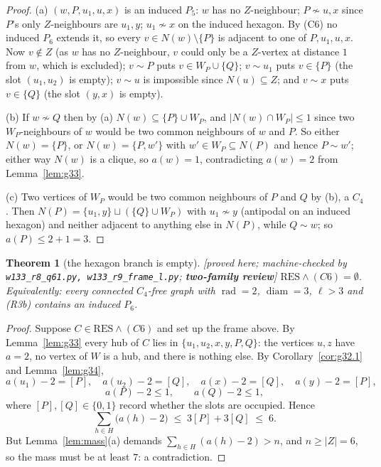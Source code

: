 \documentclass[11pt]{article}
\theoremstyle{plain}
\newtheorem{theorem}{Theorem}[section]
\theoremstyle{definition}
\theoremstyle{remark}
\numberwithin{equation}{section}
\newcommand{\rad}{\operatorname{rad}}
\newcommand{\diam}{\operatorname{diam}}
\newcommand{\statusbox}[1]{{\small\sloppy\textsf{[#1]}}}
\newcommand{\REV}[1]{\statusbox{proved here; machine-checked by \texttt{#1};
\textbf{two-family review}}}
\begin{document}
\begin{proof}
(a) $(w,P,u_1,u,x)$ is an induced $P_5$: $w$ has no $Z$-neighbour; $P \not\sim u,x$ since
$P$'s only $Z$-neighbours are $u_1,y$; $u_1\not\sim x$ on the induced hexagon. By (C6) no
induced $P_6$ extends it, so every $v \in N(w)\setminus\{P\}$ is adjacent to one of
$P,u_1,u,x$. Now $v \notin Z$ (as $w$ has no $Z$-neighbour, $v$ could only be a $Z$-vertex at
distance $1$ from $w$, which is excluded); $v \sim P$ puts $v \in W_P\cup\{Q\}$;
$v \sim u_1$ puts $v \in \{P\}$ (the slot $(u_1,u_2)$ is empty); $v \sim u$ is impossible
since $N(u)\subseteq Z$; and $v \sim x$ puts $v \in \{Q\}$ (the slot $(y,x)$ is empty).

(b) If $w \not\sim Q$ then by (a) $N(w) \subseteq \{P\}\cup W_P$, and
$|N(w)\cap W_P| \le 1$ since two $W_P$-neighbours of $w$ would be two common neighbours of
$w$ and $P$. So either $N(w) = \{P\}$, or $N(w) = \{P,w'\}$ with $w' \in W_P \subseteq N(P)$ and hence
$P \sim w'$; either way $N(w)$ is a clique, so $a(w) = 1$, contradicting $a(w) = 2$ from Lemma~\ref{lem:g33}.

(c) Two vertices of $W_P$ would be two common neighbours of $P$ and $Q$ by (b), a $C_4$.
Then $N(P) = \{u_1,y\}\sqcup(\{Q\}\cup W_P)$ with $u_1 \not\sim y$ (antipodal on an induced
hexagon) and neither adjacent to anything else in $N(P)$, while $Q \sim w$; so
$a(P) \le 2 + 1 = 3$.
\end{proof}

\begin{theorem}[the hexagon branch is empty]\label{thm:g35}
\REV{w133\_r8\_q61.py, w133\_r9\_frame\_l.py}
$\mathrm{RES}\wedge(C6) = \emptyset$. Equivalently: every connected $C_4$-free graph with
$\rad = 2$, $\diam = 3$, $\ell > 3$ and (R3b) contains an induced $P_6$.
\end{theorem}

\begin{proof}
Suppose $C \in \mathrm{RES}\wedge (C6)$ and set up the frame above. By
Lemma~\ref{lem:g33} every hub of $C$ lies in $\{u_1,u_2,x,y,P,Q\}$: the vertices $u,z$ have
$a = 2$, no vertex of $W$ is a hub, and there is nothing else. By
Corollary~\ref{cor:g32.1} and Lemma~\ref{lem:g34},
\[
  a(u_1)-2 = [P],\quad a(u_2)-2 = [Q],\quad a(x)-2=[Q],\quad a(y)-2=[P],
\]
\[
  a(P)-2 \le 1,\qquad a(Q)-2\le 1,
\]
where $[P],[Q] \in \{0,1\}$ record whether the slots are occupied. Hence
\[
  \sum_{h\in H}\bigl(a(h)-2\bigr) \;\le\; 3[P]+3[Q] \;\le\; 6 .
\]
But Lemma~\ref{lem:mass}(a) demands $\sum_{h\in H}(a(h)-2) > n$, and $n \ge |Z| = 6$, so the
mass must be at least $7$: a contradiction.
\end{proof}
\end{document}
